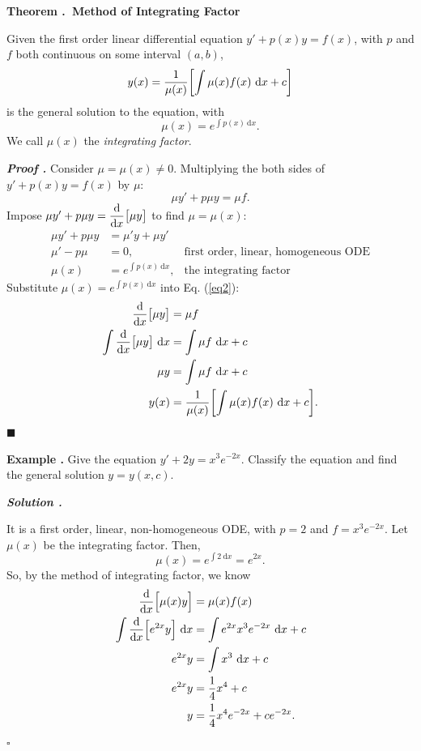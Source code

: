 \documentclass[12pt, a4paper]{article}
\newcounter{index}[subsection]
\newenvironment*{eg}{\begin{framed}\par\noindent\textbf{Example \thesubsection.\stepcounter{index}\theindex}}{\par\end{framed}}
\newenvironment*{thm}[1]{\begin{tcolorbox}\par\noindent\textbf{Theorem \thesubsection.\stepcounter{index}\theindex\ #1} \par}{\par\end{tcolorbox}}
\newcounter{nprf}[subsection]
\newenvironment*{prf}{\par\indent\textbf{\textit{Proof \stepcounter{nprf}\thenprf.}}}{\hfill$\blacksquare$\par}
\newenvironment*{sol}{\par\indent\textbf{\textit{Solution \stepcounter{nprf}\thenprf.}}\par}{\hfill{$\square$}\par}
\def\d{{\mathrm{d}}}
\def\dsst{\displaystyle}
\begin{document}
\begin{thm}{Method of Integrating Factor}
	Given the first order linear differential equation $y'+p(x)y=f(x)$, with $p$ and $f$ both continuous on some interval $(a,b)$, \[y(x)=\dfrac{1}{\mu(x)}\qty[\int\mu(x)f(x)\ \d x+c]\] is the general solution to the equation, with \[\mu(x)=e^{\int p(x)\ \d x}.\] We call $\mu(x)$ the \textit{integrating factor}.
\end{thm}
\begin{prf}
	Consider $\mu=\mu(x)\neq0$. Multiplying the both sides of $y'+p(x)y=f(x)$ by $\mu$: \begin{equation}\label{eq2}\mu y'+p\mu y=\mu f.\end{equation} Impose $\mu y'+p\mu y=\dsst\dv{x}\qty\big[\mu y]$ to find $\mu=\mu(x)$: \[\begin{aligned}\mu y'+p\mu y&=\mu' y+\mu y'\\\mu'-p\mu&=0,&\text{first order, linear, homogeneous ODE}\\\mu(x)&=e^{\int p(x)\ \d x}, &\text{the integrating factor}\end{aligned}\] Substitute $\mu(x)=e^{\int p(x)\ \d x}$ into Eq. (\ref{eq2}): \[\begin{aligned}\dv{x}\qty\big[\mu y]&=\mu f\\\int\dv{x}\qty\big[\mu y]\ \d x&=\int\mu f\ \d x+c\\\mu y&=\int\mu f\ \d x+c\\y(x)&=\dfrac{1}{\mu(x)}\qty[\int\mu(x)f(x)\ \d x+c].\end{aligned}\]
\end{prf}
\begin{eg}
	Give the equation $y'+2y=x^3e^{-2x}$. Classify the equation and find the general solution $y=y(x,c)$.
	\begin{sol}
		It is a first order, linear, non-homogeneous ODE, with $p=2$ and $f=x^3e^{-2x}$. Let $\mu(x)$ be the integrating factor. Then, \[\mu(x)=e^{\int2\ \d x}=e^{2x}.\] So, by the method of integrating factor, we know \[\begin{aligned}\dv{x}\qty\Big[\mu(x)y]&=\mu(x)f(x)\\\int\dv{x}\qty\Big[e^{2x}y]\ \d{x}&=\int e^{2x}x^3e^{-2x}\ \d{x}+c\\e^{2x}y&=\int x^3\ \d{x}+c\\e^{2x}y&=\dfrac{1}{4}x^4+c\\y&=\dfrac{1}{4}x^4e^{-2x}+ce^{-2x}.\end{aligned}\]
	\end{sol}
\end{eg}
\end{document}
